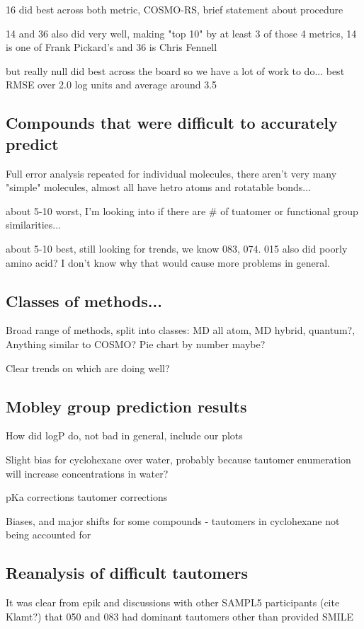 16 did best across both metric, COSMO-RS, brief statement about procedure

14 and 36 also did very well, making "top 10" by at least 3 of those 4 metrics, 14 is one of Frank Pickard's and 36 is Chris Fennell

but really null did best across the board so we have a lot of work to do... best RMSE over 2.0 log units and average around 3.5


\subsection{Compounds that were difficult to accurately predict}
\label{results:3}
Full error analysis repeated for individual molecules, there aren't very many "simple" molecules, almost all have hetro atoms and rotatable bonds...

about 5-10 worst, I'm looking into if there are # of tuatomer or functional group similarities...

about 5-10 best, still looking for trends, we know 083, 074. 015 also did poorly amino acid? I don't know why that would cause more problems in general. 


\subsection{Classes of methods...}
\label{results:4}
Broad range of methods, split into classes: MD all atom, MD hybrid, quantum?, Anything similar to COSMO? %
Pie chart by number maybe?

Clear trends on which are doing well? 

\subsection{Mobley group prediction results}
\label{results:5}
How did logP do, not bad in general, include our plots

Slight bias for cyclohexane over water, probably because tautomer enumeration will increase concentrations in water?

pKa corrections
tautomer corrections

Biases, and major shifts for some compounds - tautomers in cyclohexane not being accounted for

\subsection{Reanalysis of difficult tautomers} %
\label{results:6}
It was clear from epik and discussions with other SAMPL5 participants (cite Klamt?)  that 050 and 083 had dominant tautomers other than provided SMILE

